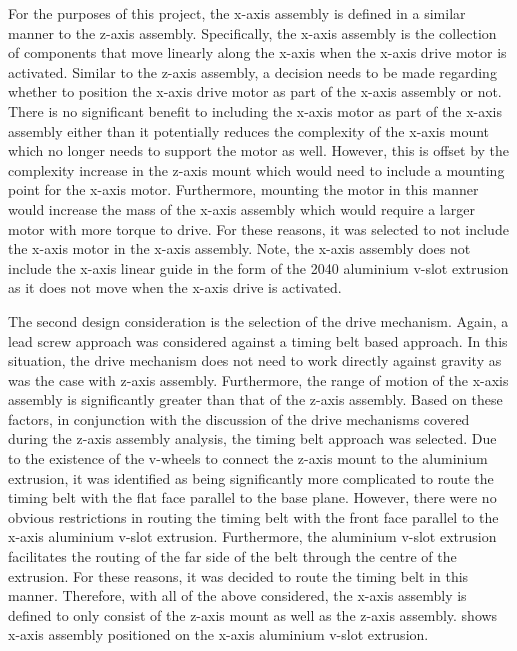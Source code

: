 For the purposes of this project, the x-axis assembly is defined in a similar manner to the z-axis assembly. Specifically, the x-axis assembly is the collection of components that move linearly along the x-axis when the x-axis drive motor is activated. Similar to the z-axis assembly, a decision needs to be made regarding whether to position the x-axis drive motor as part of the x-axis assembly or not. There is no significant benefit to including the x-axis motor as part of the x-axis assembly either than it potentially reduces the complexity of the x-axis mount which no longer needs to support the motor as well. However, this is offset by the complexity increase in the z-axis mount which would need to include a mounting point for the x-axis motor. Furthermore, mounting the motor in this manner would increase the mass of the x-axis assembly which would require a larger motor with more torque to drive. For these reasons, it was selected to not include the x-axis motor in the x-axis assembly. Note, the x-axis assembly does not include the x-axis linear guide in the form of the 2040 aluminium v-slot extrusion as it does not move when the x-axis drive is activated.

The second design consideration is the selection of the drive mechanism. Again, a lead screw approach was considered against a timing belt based approach. In this situation, the drive mechanism does not need to work directly against gravity as was the case with z-axis assembly. Furthermore, the range of motion of the x-axis assembly is significantly greater than that of the z-axis assembly. Based on these factors, in conjunction with the discussion of the drive mechanisms covered during the z-axis assembly analysis, the timing belt approach was selected. Due to the existence of the v-wheels to connect the z-axis mount to the aluminium extrusion, it was identified as being significantly more complicated to route the timing belt with the flat face parallel to the base plane. However, there were no obvious restrictions in routing the timing belt with the front face parallel to the x-axis aluminium v-slot extrusion. Furthermore, the aluminium v-slot extrusion facilitates the routing of the far side of the belt through the centre of the extrusion. For these reasons, it was decided to route the timing belt in this manner. Therefore, with all of the above considered, the x-axis assembly is defined to only consist of the z-axis mount as well as the z-axis assembly.  shows x-axis assembly positioned on the x-axis aluminium v-slot extrusion.

